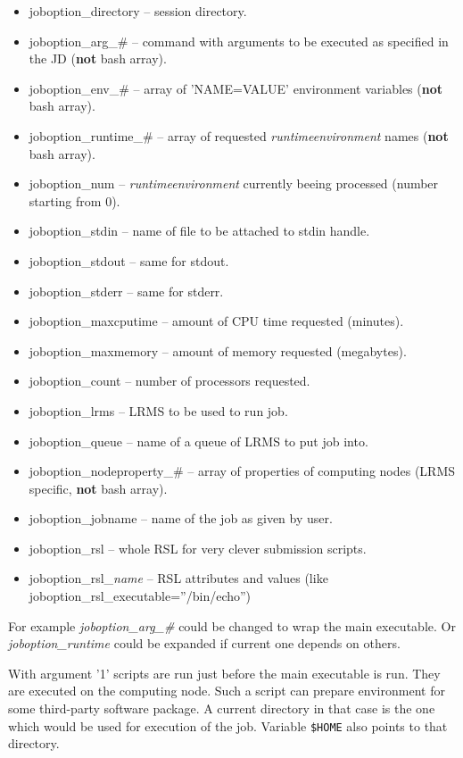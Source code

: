 \documentclass{article}                            %
\begin{document}
\begin{itemize}
\item joboption\_directory -- session directory.
\item joboption\_arg\_\# -- command with arguments to be executed as specified
in the JD (\textbf{not} bash array).
\item joboption\_env\_\# -- array of 'NAME=VALUE' environment variables (\textbf{not}
bash array).
\item joboption\_runtime\_\# -- array of requested \emph{runtimeenvironment}
names (\textbf{not} bash array).
\item joboption\_num -- \emph{runtimeenvironment} currently beeing processed
(number starting from 0).
\item joboption\_stdin -- name of file to be attached to stdin handle.
\item joboption\_stdout -- same for stdout.
\item joboption\_stderr -- same for stderr.
\item joboption\_maxcputime -- amount of CPU time requested (minutes).
\item joboption\_maxmemory -- amount of memory requested (megabytes).
\item joboption\_count -- number of processors requested.
\item joboption\_lrms -- LRMS to be used to run job.
\item joboption\_queue -- name of a queue of LRMS to put job into.
\item joboption\_nodeproperty\_\# -- array of properties of computing nodes
(LRMS specific, \textbf{not} bash array).
\item joboption\_jobname -- name of the job as given by user.
\item joboption\_rsl -- whole RSL for very clever submission scripts.
\item joboption\_rsl\_\emph{name} -- RSL attributes and values (like joboption\_rsl\_executable=''/bin/echo'')
\end{itemize}

For example \emph{joboption\_arg\_\#} could be changed to wrap the main
executable. Or \emph{joboption\_runtime} could be expanded if current
one depends on others.

With argument '1' scripts are run just before the main executable is run.
They are executed on the computing node. Such a script can prepare environment
for some third-party software package. A current directory in that
case is the one which would be used for execution of the job. Variable \verb|$HOME|
also points to that directory.
\end{document}

